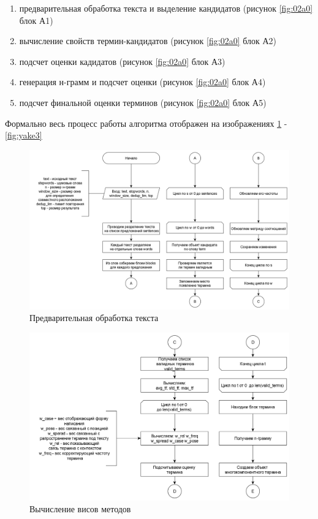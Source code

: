 \begin{enumerate}
	\item предварительная обработка текста и выделение кандидатов (рисунок \ref{fig:02a0} блок А1)
	\item вычисление свойств термин-кандидатов (рисунок \ref{fig:02a0} блок А2)
	\item подсчет оценки кадидатов (рисунок \ref{fig:02a0} блок А3)
	\item генерация н-грамм и подсчет оценки (рисунок \ref{fig:02a0} блок А4)
	\item подсчет финальной оценки терминов (рисунок \ref{fig:02a0} блок А5)
\end{enumerate}

Формально весь процесс работы алгоритма отображен на изображениях \ref{fig:yake1} - \ref{fig:yake3}
\begin{figure}[!h]
	\centering
	\includegraphics[width=0.7\linewidth]{src/img/design/yake_1}
	\caption{Предварительная обработка текста}
	\label{fig:yake1}
\end{figure}

\begin{figure}[!h]
	\centering
	\includegraphics[width=0.7\linewidth]{src/img/design/yake_2}
	\caption{Вычисление висов методов}
	\label{fig:yake2}
\end{figure}

